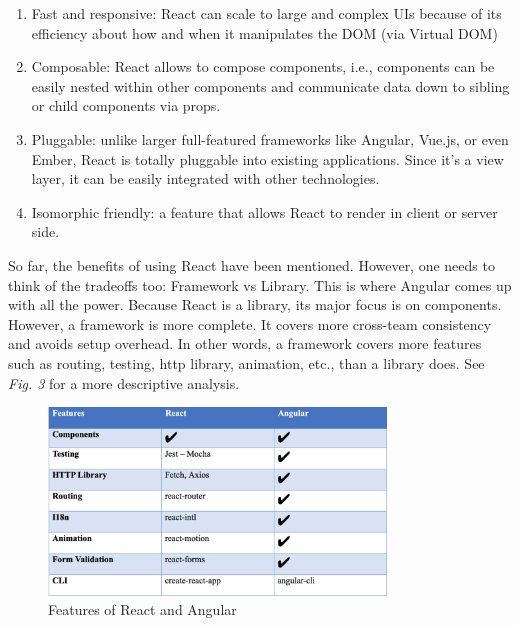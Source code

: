 \begin{enumerate}
    \item Fast and responsive: React can scale to large and complex UIs because of its efficiency about how and when it manipulates the DOM (via Virtual DOM)
    \item Composable: React allows to compose components, i.e., components can be easily nested within other components and communicate data down to sibling or child components via props.
    \item Pluggable: unlike larger full-featured frameworks like Angular, Vue.js, or even Ember, React is totally pluggable into existing applications. Since it’s a view layer, it can be easily integrated with other technologies.
    \item Isomorphic friendly: a feature that allows React to render in client or server side.
\end{enumerate}

\vspace{0.5cm}

So far, the benefits of using React have been mentioned. However, one needs to think of the tradeoffs too: Framework vs Library. This is where Angular comes up with all the power. Because React is a library, its major focus is on components. However, a framework is more complete. It covers more cross-team consistency and avoids setup overhead. In other words, a framework covers more features such as routing, testing, http library, animation, etc., than a library does. See \textit{Fig. 3} for a more descriptive analysis.\\

\begin{figure}
    \centering
        \includegraphics[width=0.8\textwidth]{images/table.png}
        \caption{Features of React and Angular}    
\end{figure}

\vspace{0.5cm}

